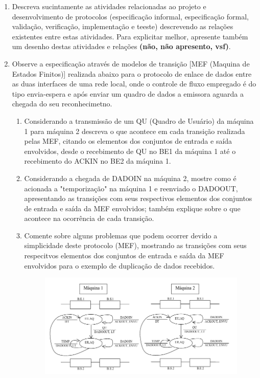 \documentclass[10pt]{article}
\begin{document}
\begin{enumerate}
    \item Descreva sucintamente as atividades relacionadas ao projeto e desenvolvimento
    de protocolos (especificação informal, especificação formal, validação, 
    verificação, implementação e teeste) descrevendo as relações existentes entre estas
    atividades. Para explicitar melhor, apresente também um desenho destas atividades e
    relações \textbf{(não, não apresento, vsf)}.

    \item Observe a especificação através de modelos de transição [MEF (Maquina 
    de Estados Finitos)] realizada abaixo para o protocolo de enlace de dados entre
    as duas interfaces de uma rede local, onde o controle de fluxo empregado é do tipo
    envia-espera e após enviar um quadro de dados a emissora aguarda a chegada do seu
    reconhecimetno.
    \begin{enumerate}
        \item Considerando a transmissão de um QU (Quadro de Usuário) da máquina 1 
        para máquina 2 descreva o que acontece em cada transição realizada pelas MEF,
        citando os elementos dos conjuntos de entrada e saída envolvidos, desde
        o recebimento de QU no BE1 da máquina 1 até o recebimento do ACKIN no BE2 da
        máquina 1.
        \item Considerando a chegada de DADOIN na máquina 2, mostre como é acionada
        a "temporização" na máquina 1 e reenviado o DADOOUT, apresentando as transições
        com seus respectivos elementos dos conjuntos de entrada e saída da MEF 
        envolvidos; também explique sobre o que acontece na ocorrência de cada 
        transição. 
        \item Comente sobre alguns problemas que podem ocorrer devido a simplicidade 
        deste protocolo (MEF), mostrando as transições com seus respecitvos elementos
        dos conjuntos de entrada e saída da MEF envolvidos para o exemplo de duplicação
        de dados recebidos.
        \begin{figure}[h!]
            \includegraphics[width=\linewidth]{mef.png}

\end{figure}
\end{enumerate}
\end{enumerate}
\end{document}
